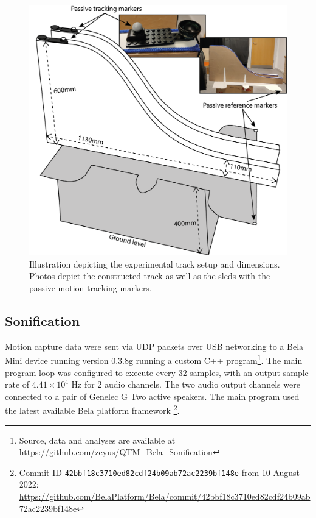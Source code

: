 \documentclass[10pt,a4paper,onecolumn]{article}
\begin{document}
\begin{figure}[h]

{\centering \includegraphics[width=1\linewidth]{figures/track_dimensions} 

}

\caption{Illustration depicting the experimental track setup and dimensions. Photos depict the constructed track as well as the sleds with the passive motion tracking markers.}\label{fig:track-setup}
\end{figure}

\hypertarget{sonification-1}{%
\subsection{Sonification}\label{sonification-1}}

Motion capture data were sent via UDP packets over USB networking to a Bela Mini device running version 0.3.8g running a custom C++ program\footnote{Source, data and analyses are available at \url{https://github.com/zeyus/QTM_Bela_Sonification}}. The main program loop was configured to execute every 32 samples, with an output sample rate of \ensuremath{4.41\times 10^{4}} Hz for 2 audio channels. The two audio output channels were connected to a pair of Genelec G Two active speakers. The main program used the latest available Bela platform framework \footnote{Commit ID \texttt{42bbf18c3710ed82cdf24b09ab72ac2239bf148e} from 10 August 2022: \url{https://github.com/BelaPlatform/Bela/commit/42bbf18c3710ed82cdf24b09ab72ac2239bf148e}}.
\end{document}
